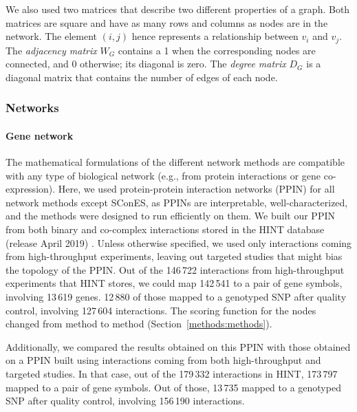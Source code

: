 \documentclass[10pt,letterpaper]{article}
\begin{document}
We also used two matrices that describe two different properties of a graph. Both matrices are square and have as many rows and columns as nodes are in the network. The element $(i,j)$ hence represents a relationship between $v_i$ and $v_j$. The \emph{adjacency matrix} $W_G$ contains a 1 when the corresponding nodes are connected, and 0 otherwise; its diagonal is zero. The \emph{degree matrix} $D_G$ is a diagonal matrix that contains the number of edges of each node.

\subsubsection{Networks}
\label{methods:networks}

\paragraph{Gene network}
The mathematical formulations of the different network methods are compatible with any type of biological network (e.g., from protein interactions or gene co-expression). Here, we used protein-protein interaction networks (PPIN) for all network methods except SConES, as PPINs are interpretable, well-characterized, and the methods were designed to run efficiently on them. We built our PPIN from both binary and co-complex interactions stored in the HINT database (release April 2019) \cite{das_hint:_2012}. Unless otherwise specified, we used only interactions coming from high-throughput experiments, leaving out targeted studies that might bias the topology of the PPIN. Out of the 146\,722 interactions from high-throughput experiments that HINT stores, we could map 142\,541 to a pair of gene symbols, involving 13\,619 genes. 12\,880 of those mapped to a genotyped SNP after quality control, involving 127\,604 interactions. The scoring function for the nodes changed from method to method (Section~\ref{methods:methods}).

Additionally, we compared the results obtained on this PPIN with those obtained on a PPIN built using interactions coming from both high-throughput and targeted studies. In that case, out of the 179\,332 interactions in HINT, 173\,797 mapped to a pair of gene symbols. Out of those, 13\,735 mapped to a genotyped SNP after quality control, involving 156\,190 interactions.
\end{document}
